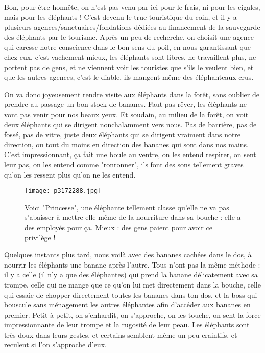 \documentclass{book}
\begin{document}
Bon, pour être honnête, on n'est pas venu par ici pour le frais, ni pour les cigales, mais pour les éléphants ! C'est devenu le truc touristique du coin, et il y a plusieurs agences/sanctuaires/fondations dédiées au financement de la sauvegarde des éléphants par le tourisme. Après un peu de recherche, on choisit une agence qui caresse notre conscience dans le bon sens du poil, en nous garantissant que chez eux, c'est vachement mieux, les éléphants sont libres, ne travaillent plus, ne portent pas de gens, et ne viennent voir les touristes que s'ils le veulent bien, et que les autres agences, c'est le diable, ils mangent même des éléphanteaux crus.

On va donc joyeusement rendre visite aux éléphants dans la forêt, sans oublier de prendre au passage un bon stock de bananes. Faut pas rêver, les éléphants ne vont pas venir pour nos beaux yeux. Et soudain, au milieu de la forêt, on voit deux éléphants qui se dirigent nonchalamment vers nous. Pas de barrière, pas de fossé, pas de vitre, juste deux éléphants qui se dirigent vraiment dans notre direction, ou tout du moins en direction des bananes qui sont dans nos mains. C'est impressionnant, ça fait une boule au ventre, on les entend respirer, on sent leur pas, on les entend comme "ronronner", ils font des sons tellement graves qu'on les ressent plus qu'on ne les entend.


\begin{figure}[h]
\centering
\texttt{[image: p3172288.jpg]}
\caption*{Voici "Princesse", une éléphante tellement classe qu'elle ne va pas s'abaisser à mettre elle même de la nourriture dans sa bouche : elle a des employés pour ça. Mieux : des gens paient pour avoir ce privilège !}
\end{figure}

Quelques instants plus tard, nous voilà avec des bananes cachées dans le dos, à nourrir les éléphants une banane après l'autre. Tous n'ont pas la même méthode : il y a celle (il n'y a que des éléphantes) qui prend la banane délicatement avec sa trompe, celle qui ne mange que ce qu'on lui met directement dans la bouche, celle qui essaie de chopper directement toutes les bananes dans ton dos, et la boss qui bouscule sans ménagement les autres éléphantes afin d'accéder aux bananes en premier. Petit à petit, on s’enhardit, on s'approche, on les touche, on sent la force impressionnante de leur trompe et la rugosité de leur peau. Les éléphants sont très doux dans leurs gestes, et certains semblent même un peu craintifs, et reculent si l'on s'approche d'eux.
\end{document}
